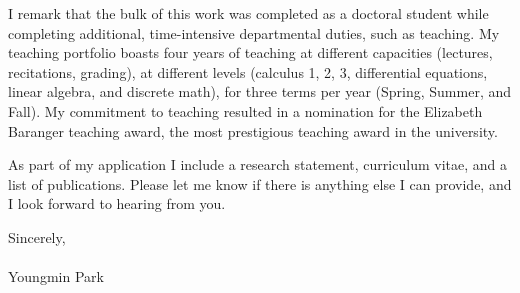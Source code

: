 \documentclass[11pt, a4paper]{letter} %
\begin{document}
\begin{letter}{}
I remark that the bulk of this work was completed as a doctoral student while completing additional, time-intensive departmental duties, such as teaching. My teaching portfolio boasts four years of teaching at different capacities (lectures, recitations, grading), at different levels (calculus 1, 2, 3, differential equations, linear algebra, and discrete math), for three terms per year (Spring, Summer, and Fall). My commitment to teaching resulted in a nomination for the Elizabeth Baranger teaching award, the most prestigious teaching award in the university.

As part of my application I include a research statement, curriculum vitae, and a list of publications. Please let me know if there is anything else I can provide, and I look forward to hearing from you.

\closing{Sincerely,\\
\\
Youngmin Park
}



\end{letter}
\end{document}
